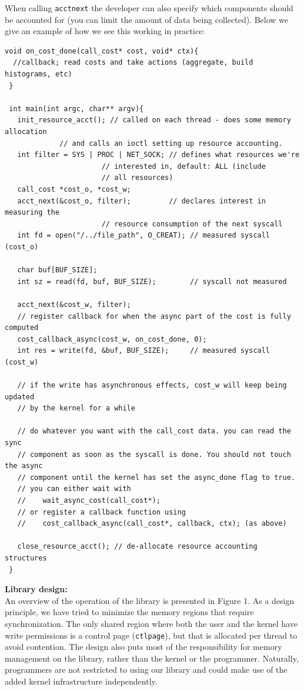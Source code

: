 \documentclass[12pt]{article}
\def\_{\textunderscore\-}
\begin{document}
When calling \texttt{acct\_next} the developer can also specify which components should be accounted for (you can limit the amount of data being collected). Below we give an example of how we see this working in practice:

\vspace{1em}
\lstset{style=customc, captionpos=b}
\begin{lstlisting}[caption=Sample code using the \texttt{rsrcfl} library]
 void on_cost_done(call_cost* cost, void* ctx){
  //callback; read costs and take actions (aggregate, build histograms, etc)
 }

 int main(int argc, char** argv){
   init_resource_acct(); // called on each thread - does some memory allocation
			 // and calls an ioctl setting up resource accounting.
   int filter = SYS | PROC | NET_SOCK; // defines what resources we're
				       // interested in, default: ALL (include
				       // all resources)
   call_cost *cost_o, *cost_w;
   acct_next(&cost_o, filter);         // declares interest in measuring the
				       // resource consumption of the next syscall
   int fd = open("/../file_path", O_CREAT); // measured syscall (cost_o)

   char buf[BUF_SIZE];
   int sz = read(fd, buf, BUF_SIZE);        // syscall not measured

   acct_next(&cost_w, filter);
   // register callback for when the async part of the cost is fully computed
   cost_callback_async(cost_w, on_cost_done, 0);
   int res = write(fd, &buf, BUF_SIZE);     // measured syscall (cost_w)

   // if the write has asynchronous effects, cost_w will keep being updated 
   // by the kernel for a while

   // do whatever you want with the call_cost data. you can read the sync
   // component as soon as the syscall is done. You should not touch the async
   // component until the kernel has set the async_done flag to true.
   // you can either wait with
   //    wait_async_cost(call_cost*);
   // or register a callback function using
   //    cost_callback_async(call_cost*, callback, ctx); (as above)

   close_resource_acct(); // de-allocate resource accounting structures
 }
 \end{lstlisting}
 
\pagebreak 
\noindent\textbf{Library design:\\}
An overview of the operation of the library is presented in Figure 1. As a design principle, we have tried to minimize the memory regions that require synchronization. The only shared region where both the user and the kernel have write permissions is a control page (\texttt{ctl\_page}), but that is allocated per thread to avoid contention. The design also puts most of the responsibility for memory management on the library, rather than the kernel or the programmer. Naturally, programmers are not restricted to using our library and could make use of the added kernel infrastructure independently.
\end{document}
